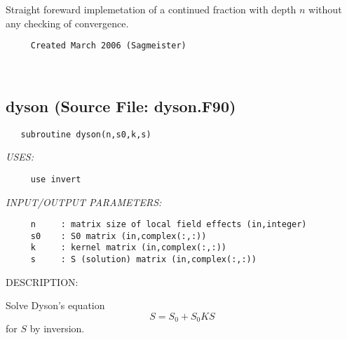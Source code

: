 \documentclass[11pt]{article}
\begin{document}
     Straight foreward implemetation of a continued fraction with depth $n$
     without any checking of convergence.
  
\begin{verbatim}     Created March 2006 (Sagmeister)\end{verbatim}
















 
 
\mbox{}\hrulefill\ 
 
\subsection{dyson (Source File: dyson.F90)}


\begin{verbatim}   subroutine dyson(n,s0,k,s)\end{verbatim}{\em USES:}
\begin{verbatim}     use invert\end{verbatim}{\em INPUT/OUTPUT PARAMETERS:}
\begin{verbatim}     n     : matrix size of local field effects (in,integer)
     s0    : S0 matrix (in,complex(:,:))
     k     : kernel matrix (in,complex(:,:))
     s     : S (solution) matrix (in,complex(:,:))\end{verbatim}
{\sf DESCRIPTION:\\ }


     Solve Dyson's equation
       $$   S = S_0 + S_0 K S  $$
     for $S$ by inversion.
  
\end{document}
